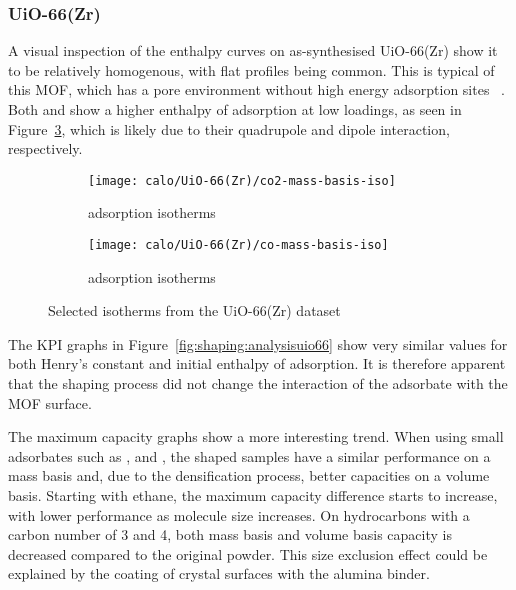 
\subsubsection{UiO-66(Zr)}

A visual inspection of the enthalpy curves on as-synthesised UiO-66(Zr)
show it to be relatively homogenous, with flat 
profiles being common. This is typical of this MOF, which has 
a pore environment without high energy adsorption sites
~\cite{wiersumEvaluationUiO66GasBased2011}.
Both  and  show a higher enthalpy of adsorption 
at low loadings, as seen in Figure~\ref{fgr:shaping:uio66isotherms},
which is likely due to their quadrupole and dipole interaction,
respectively.

\begin{figure}[htbp]
    \begin{subfigure}{0.5\textwidth}
        \texttt{[image: calo/UiO-66(Zr)/co2-mass-basis-iso]}
        \caption{ adsorption isotherms}%
        \label{fgr:shaping:uio66co2ads}
    \end{subfigure}
    \begin{subfigure}{0.5\textwidth}
        \texttt{[image: calo/UiO-66(Zr)/co-mass-basis-iso]}
        \caption{ adsorption isotherms}%
        \label{fgr:shaping:uio66coads}
    \end{subfigure}%
    \caption{Selected isotherms from the UiO-66(Zr) dataset}%
    \label{fgr:shaping:uio66isotherms}
\end{figure}

The KPI graphs in Figure~\ref{fig:shaping:analysisuio66} show very 
similar values for both Henry's constant and initial 
enthalpy of adsorption. It is therefore apparent that the shaping process
did not change the interaction of the adsorbate with the MOF surface.

The maximum capacity graphs show a more interesting trend.
When using small adsorbates such as ,  and , 
the shaped samples have a similar performance on a mass basis and, 
due to the densification process, better capacities on a volume
basis. Starting with ethane, the maximum capacity difference starts 
to increase, with lower performance as molecule size increases. 
On hydrocarbons with a carbon number of 3 and 4, both mass basis and 
volume basis capacity is decreased compared to the original powder.
This size exclusion effect could be explained by the coating of
crystal surfaces with the alumina binder.

